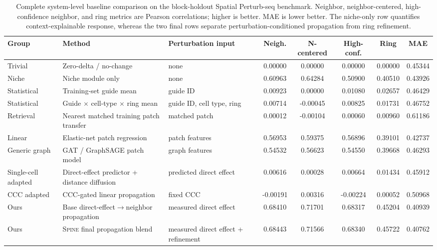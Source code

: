 \documentclass[sigconf,review,balance=false]{acmart}
\newcommand{\methodname}{\textsc{Spine}\xspace}
\begin{document}
\begin{table}[t]
\centering
\caption{Complete system-level baseline comparison on the block-holdout Spatial Perturb-seq benchmark. Neighbor, neighbor-centered, high-confidence neighbor, and ring metrics are Pearson correlations; higher is better. MAE is lower better. The niche-only row quantifies context-explainable response, whereas the two final rows separate perturbation-conditioned propagation from ring refinement.}
\label{tab:app_full_baseline_comparison}
\footnotesize
\setlength{\tabcolsep}{3pt}
\renewcommand{\arraystretch}{1.12}
\begin{tabularx}{\textwidth}{@{}>{\raggedright\arraybackslash}p{}
>{\raggedright\arraybackslash}X
>{\raggedright\arraybackslash}p{}
ccccc@{}}
\toprule
Group & Method & Perturbation input & Neigh. & N-centered & High-conf. & Ring & MAE \\
\midrule
Trivial &
Zero-delta / no-change &
none &
0.00000 & 0.00000 & 0.00000 & 0.00000 & 0.45344 \\

Niche &
Niche module only &
none &
0.60963 & 0.64284 & 0.50900 & 0.40510 & 0.43926 \\

Statistical &
Training-set guide mean &
guide ID &
0.00923 & 0.00000 & 0.01080 & 0.02657 & 0.46429 \\

Statistical &
Guide $\times$ cell-type $\times$ ring mean &
guide ID, cell type, ring &
0.00714 & -0.00045 & 0.00825 & 0.01731 & 0.46752 \\

Retrieval &
Nearest matched training patch transfer &
matched patch &
0.00012 & -0.00104 & 0.00060 & 0.00960 & 0.61186 \\

Linear &
Elastic-net patch regression &
patch features &
0.56953 & 0.59375 & 0.56896 & 0.39101 & 0.42737 \\

Generic graph &
GAT / GraphSAGE patch model &
graph features &
0.54532 & 0.56623 & 0.54550 & 0.39668 & 0.46293 \\

Single-cell adapted &
Direct-effect predictor + distance diffusion &
predicted direct effect &
0.00616 & 0.00028 & 0.00664 & 0.01434 & 0.45912 \\

CCC adapted &
CCC-gated linear propagation &
fixed CCC &
-0.00191 & 0.00316 & -0.00224 & 0.00052 & 0.50968 \\

Ours &
Base direct-effect$\rightarrow$neighbor propagation &
measured direct effect &
0.68410 & 0.71701 & 0.68317 & 0.45204 & 0.40939 \\

\rowcolor{blue!7}
Ours &
\methodname{} final propagation blend &
measured direct effect + refinement &
0.68443 & 0.71566 & 0.68340 & 0.45722 & 0.40762 \\
\bottomrule
\end{tabularx}
\end{table}
\end{document}
